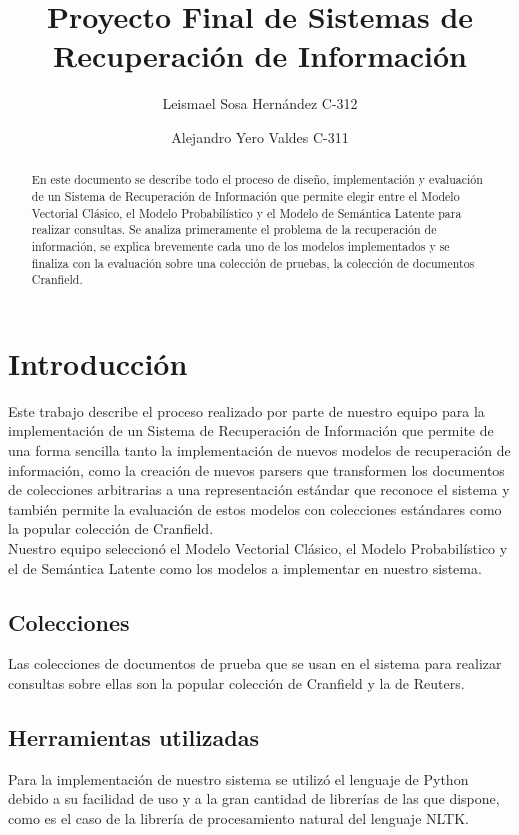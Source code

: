 \documentclass[12pt]{article}
\begin{document}
\title{Proyecto Final de Sistemas de Recuperación de Información}
\author{Leismael Sosa Hernández C-312 \and Alejandro Yero Valdes C-311}
\date{}

\maketitle

\begin{abstract}
	En este documento se describe todo el proceso de diseño, implementación y
	evaluación de un Sistema de Recuperación de Información que permite
	elegir entre el Modelo Vectorial Clásico, el Modelo Probabilístico y el
	Modelo de Semántica Latente para realizar consultas. Se analiza primeramente
	el problema de la recuperación de información, se explica brevemente
	cada uno de los modelos implementados y se finaliza con la evaluación
	sobre una colección de pruebas, la colección de documentos Cranfield.
\end{abstract}

\section{Introducción}
Este trabajo describe el proceso realizado por parte de nuestro equipo
para la implementación de un Sistema de Recuperación de Información que permite
de una forma sencilla tanto la implementación de nuevos modelos de recuperación
de información, como la creación de nuevos parsers que transformen los documentos
de colecciones arbitrarias a una representación estándar que reconoce el sistema
y también permite la evaluación de estos modelos con colecciones estándares como
la popular colección de Cranfield.\\
Nuestro equipo seleccionó el Modelo Vectorial Clásico, el Modelo Probabilístico y
el de Semántica Latente como los modelos a implementar en nuestro sistema.

\subsection{Colecciones}
Las colecciones de documentos de prueba que se usan en el sistema para realizar consultas
sobre ellas son la popular colección de Cranfield y la de Reuters.

\subsection{Herramientas utilizadas}
Para la implementación de nuestro sistema se utilizó el lenguaje de Python debido
a su facilidad de uso y a la gran cantidad de librerías de las que dispone, como
es el caso de la librería de procesamiento natural del lenguaje NLTK.
\end{document}
